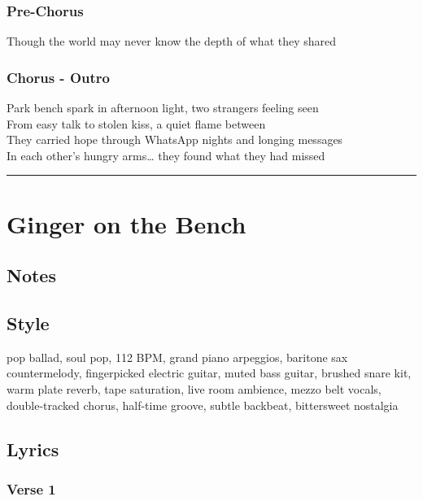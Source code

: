 \subsubsection{Pre-Chorus}\label{pre-chorus-51}

Though the world may never know the depth of what they shared

\subsubsection{Chorus - Outro}\label{chorus---outro-3}

Park bench spark in afternoon light, two strangers feeling seen\\
From easy talk to stolen kiss, a quiet flame between\\
They carried hope through WhatsApp nights and longing messages\\
In each other's hungry arms\ldots{} they found what they had missed

\begin{center}\rule{0.5\linewidth}{0.5pt}\end{center}

\section{Ginger on the Bench}\label{ginger-on-the-bench}

\subsection{Notes}\label{notes-35}

\subsection{Style}\label{style-34}

pop ballad, soul pop, 112 BPM, grand piano arpeggios, baritone sax
countermelody, fingerpicked electric guitar, muted bass guitar, brushed
snare kit, warm plate reverb, tape saturation, live room ambience, mezzo
belt vocals, double-tracked chorus, half-time groove, subtle backbeat,
bittersweet nostalgia

\subsection{Lyrics}\label{lyrics-34}

\subsubsection{Verse 1}\label{verse-1-29}

